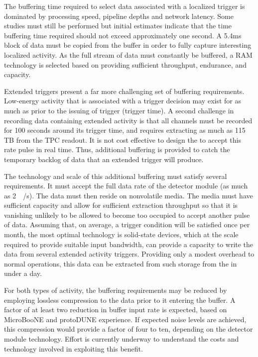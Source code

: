 The buffering time required to select data associated with a localized
trigger is dominated by processing speed, pipeline depths and network latency. Some studies must still be performed but initial estimates indicate that the time buffering time required should not exceed approximately one second. 
A  5.4\si{\milli\second} block of data must be copied from the buffer
in order to fully capture interesting localized activity. As the full stream of data must constantly be buffered, a RAM
technology is selected based on providing sufficient throughput,
endurance, and capacity. 

Extended triggers present a far more challenging set of buffering requirements.  
Low-energy activity that is associated with a  trigger
decision may exist for as much as \snbpretime prior to the issuing of 
trigger (trigger time).
A second challenge in recording data containing extended activity is
that all channels must be recorded for 100 seconds around its trigger
time, and requires extracting as much as 115 TB from the TPC readout.
It is not cost effective to design the  to accept this rate
pulse in real time. Thus, additional buffering is provided to catch
the temporary backlog of data that an extended trigger will produce.

The technology and scale of this additional buffering must satisfy several requirements. 
It must accept the full data rate of the detector module (as much as \SI{2}{\tera\byte/\second}). 
The data must then reside on nonvolatile media. 
The media must have sufficient capacity and allow for sufficient extraction throughput so that it is vanishing unlikely to be allowed to become too occupied to accept another pulse of data. 
Assuming that, on average, a  trigger condition will be
satisfied once per month, the most optimal technology is %
solid-state devices, which at the scale required to provide suitable input bandwidth, can provide a capacity to write the data from several extended activity triggers.
Providing only a modest overhead to normal operations, this data can be extracted from such storage from the  in under a day.

For both types of activity, the buffering requirements may be reduced by employing lossless compression to the data prior to it entering the buffer.
A factor of at least two reduction in buffer input rate is
expected, based on MicroBooNE and protoDUNE experience. 
If expected noise levels are achieved, this compression would provide a factor of four to ten, depending on the detector module technology.
Effort is currently underway to understand the costs and technology involved in exploiting this benefit.

